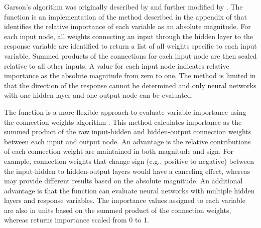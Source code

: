 \documentclass[article]{jss}
\begin{document}
Garson's algorithm was originally described by \citet{Garson91} and further modified by \citet{Goh95}.  The  function is an implementation of the method described in the appendix of \citet{Goh95} that identifies the relative importance of each variable as an absolute magnitude. For each input node, all weights connecting an input through the hidden layer to the response variable are identified to return a list of all weights specific to each input variable. Summed products of the connections for each input node are then scaled relative to all other inputs. A value for each input node indicates relative importance as the absolute magnitude from zero to one. The method is limited in that the direction of the response cannot be determined and only neural networks with one hidden layer and one output node can be evaluated.

The  function is a more flexible approach to evaluate variable importance using the connection weights algorithm \citep{Olden04}. This method calculates importance as the summed product of the raw input-hidden and hidden-output connection weights between each input and output node. An advantage is the relative contributions of each connection weight are maintained in both magnitude and sign. For example, connection weights that change sign (e.g., positive to negative) between the input-hidden to hidden-output layers would have a canceling effect, whereas  may provide different results based on the absolute magnitude. An additional advantage is that the  function can evaluate neural networks with multiple hidden layers and response variables. The importance values assigned to each variable are also in units based on the summed product of the connection weights, whereas  returns importance scaled from 0 to 1.
\end{document}
